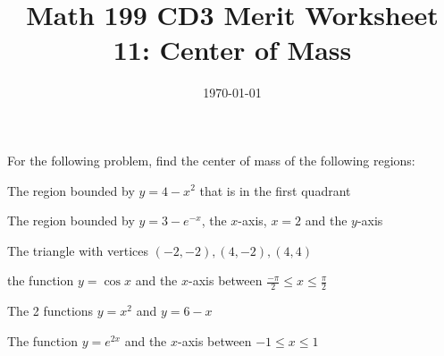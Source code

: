 

\usepackage{fullpage,amsmath,amssymb,amsthm}

\newcommand{\D}{\displaystyle}

\title{Math 199 CD3 Merit Worksheet 11: Center of Mass }
\date{\today}




\maketitle
For the following problem, find the center of mass of the following regions:
\be

	\item The region  bounded by $y=4-x^2$ that is in the first quadrant
	\vfill
	\item The region bounded by $y=3-e^{-x}$, the $x$-axis, $x=2$ and the $y$-axis
	\vfill
	\item The triangle with vertices $(-2,-2), (4,-2), (4,4)$
	\vfill
	\newpage
	\item the function $y=\cos x$ and the $x$-axis  between $\frac{-\pi}{2}\leq x\leq\frac{\pi}{2}$
	\vfill
	\item The 2 functions $y=x^2$ and $y=6-x$
	\vfill
	\item The function $y=e^{2x}$ and the $x$-axis between $-1\leq x\leq 1$\vfill

\ee

